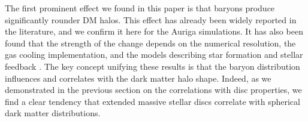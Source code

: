 \documentclass[usenatbib]{mnras}
\begin{document}
The first prominent effect we found in this paper is that  baryons produce
significantly rounder DM halos. This effect has already been  widely 
reported in the literature, and we confirm it here for the Auriga simulations.
It has also been found that the strength of the change depends on the
numerical resolution, the gas cooling implementation, and the
models describing star formation and stellar feedback
\citep{Bailin05,Debattista08, Bryan13, Butsky16, Chua19, Artale19}.  
The key concept unifying these results is that the baryon distribution
influences and correlates with the dark matter halo shape. 
Indeed, as we demonstrated in the previous section on the correlations
with disc properties, we find a clear tendency that extended
massive stellar discs correlate with spherical dark matter
distributions.  



\end{document}
